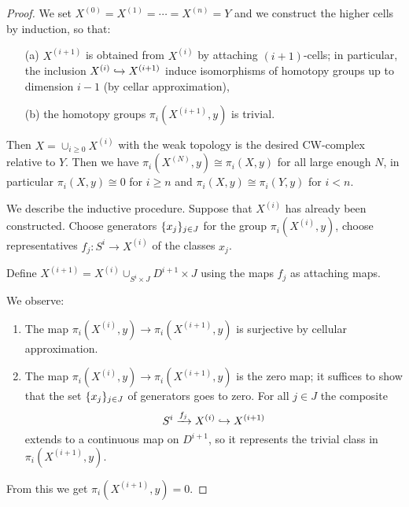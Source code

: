 \begin{proof}
We set $X^{(0)}=X^{(1)}=\cdots=X^{(n)}=Y$ and we construct the higher cells by induction, so that:
\begin{itemize}
    \item[(a)] $X^{(i+1)}$ is obtained from $X^{(i)}$ by attaching $(i+1)$-cells; in particular, the inclusion $X^{(i)}\hookrightarrow X^{(i+1)}$ induce isomorphisms of homotopy groups up to dimension $i-1$ (by cellar approximation),
    \item[(b)] the homotopy groups $\pi_i(X^{(i+1)},y)$ is trivial.
\end{itemize}

Then $X=\cup_{i\geq0}X^{(i)}$ with the weak topology is the desired CW-complex relative to $Y$. Then we have $\pi_i(X^{(N)},y)\cong\pi_i(X,y)$ for all large enough $N$, in particular $\pi_i(X,y)\cong 0$ for $i\geq n$ and $\pi_i(X,y)\cong\pi_i(Y,y)$ for $i<n$.

We describe the inductive procedure. Suppose that $X^{(i)}$ has already been constructed. Choose generators $\{x_j\}_{j\in J}$ for the group $\pi_i(X^{(i)},y)$, choose representatives $f_j:S^i\to X^{(i)}$ of the classes $x_j$.

Define $X^{(i+1)}=X^{(i)}\cup_{S^i\times J}D^{i+1}\times J$ using the maps $f_j$ as attaching maps.

We observe:
\begin{enumerate}
    \item The map $\pi_i(X^{(i)},y)\to\pi_i(X^{(i+1)},y)$ is surjective by cellular approximation.
    \item The map $\pi_i(X^{(i)},y)\to\pi_i(X^{(i+1)},y)$ is the zero map; it suffices to show that the set $\{x_j\}_{j\in J}$ of generators goes to zero. For all $j\in J$ the composite
    \[S^i\xrightarrow{f_j}X^{(i)}\hookrightarrow X^{(i+1)}\]
    extends to a continuous map on $D^{i+1}$, so it represents the trivial class in $\pi_i(X^{(i+1)},y)$.
\end{enumerate}

From this we get $\pi_i(X^{(i+1)},y)=0$.
\end{proof}
